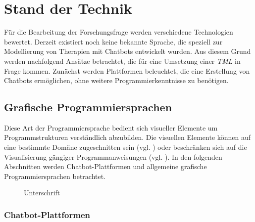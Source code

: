 
\section{Stand der Technik}
\label{ch:Forschungsstand}
Für die Bearbeitung der Forschungsfrage werden verschiedene Technologien bewertet.  Derzeit existiert noch keine bekannte Sprache, die speziell zur Modellierung von Therapien mit Chatbots entwickelt wurden. Aus diesem Grund werden nachfolgend Ansätze betrachtet, die für eine Umsetzung einer \emph{TML} in Frage kommen. Zunächst werden Plattformen beleuchtet, die eine Erstellung von Chatbots ermöglichen, ohne weitere Programmierkenntnisse zu benötigen. 

\subsection{Grafische Programmiersprachen}
Diese Art der Programmiersprache bedient sich visueller Elemente um Programmstrukturen verständlich abzubilden. Die visuellen Elemente können auf eine bestimmte Domäne zugeschnitten sein (vgl. \cite{WasistLa94:online}) oder beschränken sich auf die Visualisierung gängiger Programmanweisungen (vgl. \cite{BlocklyG57:online}). In den folgenden Abschnitten werden Chatbot-Plattformen und allgemeine grafische Programmiersprachen betrachtet.

\begin{figure}[h]
\centering
{}
\caption{Unterschrift}
\label{methVorgehen}
\end{figure}

\subsubsection{Chatbot-Plattformen}

